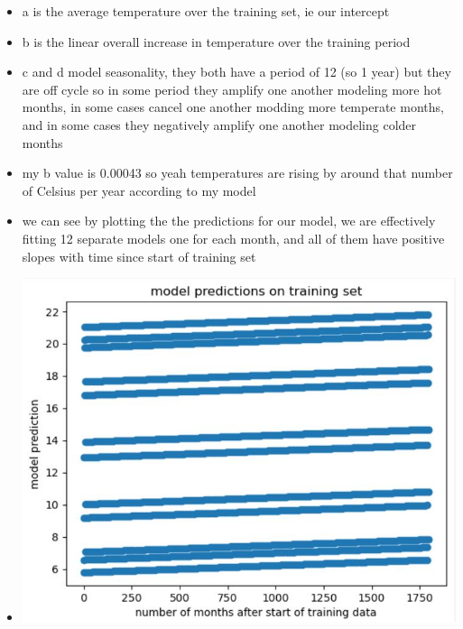 \documentclass[12pt,twoside]{article}
\begin{document}
\begin{enumerate}
\begin{enumerate}
   \begin{itemize}
     \color{blue}
       \item a is the average temperature over the training set, ie our intercept 
       \item b is the linear overall increase in temperature over the training period 
       \item c and d model seasonality, they both have a period of 12 (so 1 year) but they are off cycle so in some period they amplify one another modeling more hot months, in some cases cancel one another modding more temperate months, and in some cases they negatively amplify one another modeling colder months
       \item my b value is 0.00043 so yeah temperatures are rising by around that number of Celsius per year according to my model
       \item we can see by plotting the the predictions for our model, we are effectively fitting 12 separate models one for each month, and all of them have positive slopes with time since start of training set
       \item \includegraphics[width=15cm]{homework_code/homework_11/immages/4d.JPG}
   \end{itemize}
  \end{enumerate}

\end{enumerate}
 
\end{document}
